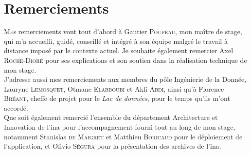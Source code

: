 	\chapter*{Remerciements}
	
	\lettrine{M}es remerciements vont tout d'abord à Gautier \textsc{Poupeau}, mon maître de stage, qui m'a accueilli, guidé, conseillé et intégré à son équipe malgré le travail à distance imposé par le contexte actuel. Je souhaite également remercier Axel \textsc{Roche-Dioré} pour ses explications et son soutien dans la réalisation technique de mon stage.\\
	
	J'adresse aussi mes remerciements aux membres du pôle \og Ingénierie de la Donnée\fg{}, Lauryne \textsc{Lemosquet}, Otmane \textsc{Elabboubi} et Akli \textsc{Abdi}, ainsi qu'à Florence \textsc{Bréant}, cheffe de projet pour le \textit{Lac de données}, pour le temps qu'ils m'ont accordé. \\
	
	Que soit également remercié l'ensemble du département \og Architecture et Innovation\fg{} de l'\ac{ina} pour l'accompagnement fourni tout au long de mon stage, notamment Stanislas \textsc{de Maigret} et Matthieu \textsc{Boricaud} pour le déploiement de l'application, et Olivio \textsc{Ségura} pour la présentation des archives de l'\ac{ina}.